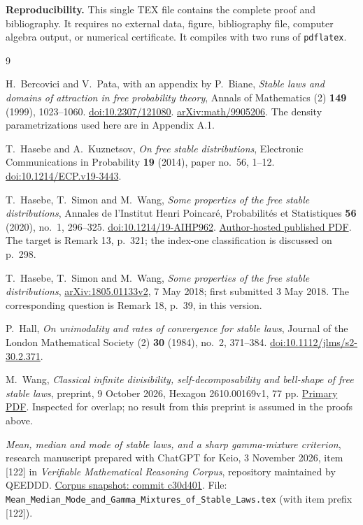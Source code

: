 \documentclass[11pt,a4paper]{article}
\theoremstyle{definition}
\theoremstyle{remark}
\numberwithin{equation}{section}
\begin{document}
\noindent\textbf{Reproducibility.}
This single TEX file contains the complete proof and bibliography.
It requires no external data, figure, bibliography file, computer
algebra output, or numerical certificate. It compiles with two runs
of \texttt{pdflatex}.

\clearpage
\begin{thebibliography}{9}

H.~Bercovici and V.~Pata, with an appendix by P.~Biane,
\emph{Stable laws and domains of attraction in free probability theory},
Annals of Mathematics (2) \textbf{149} (1999), 1023--1060.
\href{https://doi.org/10.2307/121080}{doi:10.2307/121080}.
\href{https://arxiv.org/abs/math/9905206}{arXiv:math/9905206}.
The density parametrizations used here are in Appendix A.1.

T.~Hasebe and A.~Kuznetsov,
\emph{On free stable distributions},
Electronic Communications in Probability \textbf{19} (2014),
paper no.~56, 1--12.
\href{https://doi.org/10.1214/ECP.v19-3443}{doi:10.1214/ECP.v19-3443}.

T.~Hasebe, T.~Simon and M.~Wang,
\emph{Some properties of the free stable distributions},
Annales de l'Institut Henri Poincar\'e, Probabilit\'es et Statistiques
\textbf{56} (2020), no.~1, 296--325.
\href{https://doi.org/10.1214/19-AIHP962}{doi:10.1214/19-AIHP962}.
\href{https://www.math.sci.hokudai.ac.jp/~thasebe/HasebeSimonWang-AIHP2020.pdf}{Author-hosted published PDF}.
The target is Remark 13, p.~321; the index-one classification is
discussed on p.~298.

T.~Hasebe, T.~Simon and M.~Wang,
\emph{Some properties of the free stable distributions},
\href{https://arxiv.org/abs/1805.01133v2}{arXiv:1805.01133v2},
7 May 2018; first submitted 3 May 2018.
The corresponding question is Remark 18, p.~39, in this version.

P.~Hall,
\emph{On unimodality and rates of convergence for stable laws},
Journal of the London Mathematical Society (2) \textbf{30} (1984),
no.~2, 371--384.
\href{https://doi.org/10.1112/jlms/s2-30.2.371}{doi:10.1112/jlms/s2-30.2.371}.

M.~Wang,
\emph{Classical infinite divisibility, self-decomposability and
bell-shape of free stable laws},
preprint, 9 October 2026, Hexagon 2610.00169v1, 77 pp.
\href{https://hexagonmath.org/pdf/2610.00169v1}{Primary PDF}.
Inspected for overlap; no result from this preprint is assumed
in the proofs above.

\emph{Mean, median and mode of stable laws, and a sharp gamma-mixture
criterion}, research manuscript prepared with ChatGPT for Keio,
3 November 2026, item [122] in
\emph{Verifiable Mathematical Reasoning Corpus},
repository maintained by QEEDDD.
\href{https://github.com/QEEDDD/Verifiable-Mathematical-Reasoning-Corpus/tree/c30d40119134a59eda6fa5cc6331f27c8e67d034}{Corpus snapshot: commit c30d401}.
File: \texttt{Mean\_Median\_Mode\_and\_Gamma\_Mixtures\_of\_Stable\_Laws.tex}
(with item prefix [122]).

\end{thebibliography}
\end{document}
